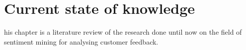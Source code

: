 %
%
\let\textcircled=\pgftextcircled
\chapter{Current state of knowledge}
\label{chap:02}

his chapter is a literature review of the research done until now on the field of sentiment mining for analysing customer feedback.
